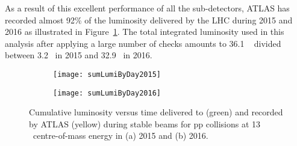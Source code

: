 As a result of this excellent performance of all the sub-detectors,
ATLAS has recorded  almost 92\% of the luminosity delivered by the LHC during 
2015 and 2016 as illustrated in  Figure~\ref{fig:exp.op.intlumi}.
The total integrated luminosity used in this analysis after 
applying a large number of checks amounts to 
 36.1 \ifb~ divided between 3.2 \ifb~in 2015 and 32.9 \ifb~in 2016.

\begin{figure}[t!]
\centering
\begin{subfigure}[t]{0.48\textwidth}
\texttt{[image: sumLumiByDay2015]}
\end{subfigure}
\begin{subfigure}[t]{0.48\textwidth}
\texttt{[image: sumLumiByDay2016]}
\end{subfigure}
\vspace{-0.3cm}
\caption{
Cumulative luminosity versus time delivered to (green) and recorded by ATLAS 
(yellow) during stable beams for pp collisions at 13 \TeV~centre-of-mass energy 
in (a) 2015 and (b) 2016.
}
\label{fig:exp.op.intlumi}
\end{figure} 


